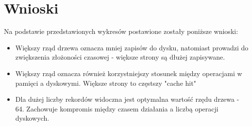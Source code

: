 \documentclass[11pt,a4paper]{article}
\begin{document}
\section*{Wnioski}

Na podstawie przedstawionych wykresów postawione zostały poniższe wnioski:

\begin{itemize}
\item Większy rząd drzewa oznacza mniej zapisów do dysku, natomiast prowadzi do zwiększenia złożoności czasowej - większe strony są dłużej zapisywane.
\item Większy rząd oznacza również korzystniejszy stosunek między operacjami w pamięci a dyskowymi. Większe strony to częstszy "cache hit"
\newpage
\item Dla dużej liczby rekordów widoczna jest optymalna wartość rzędu drzewa - 64. Zachowuje kompromis między czasem działania a liczbą operacji dyskowych.
\end{itemize}
\end{document}
